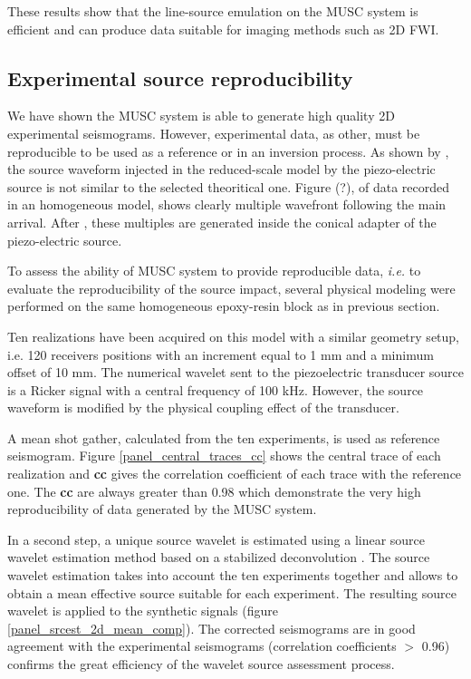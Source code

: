 \documentclass[manuscript,revised]{geophysics}
\begin{document}
\noindent These results show that the line-source emulation on the MUSC system is efficient and can produce data suitable for imaging methods such as 2D FWI.


\subsection{Experimental source reproducibility}

\noindent We have shown the MUSC system is able to generate high quality 2D experimental seismograms. However, experimental data, as other, must be reproducible to be used as a reference or in an inversion process. As shown by \citet{Bretaudeau_SSM_2011}, the source waveform injected in the reduced-scale model by the piezo-electric source is not similar to the selected theoritical one. Figure (?), of data recorded in an homogeneous model, shows clearly multiple wavefront following the main arrival. After \citet{Bretaudeau_SSM_2011}, these multiples are generated inside the conical adapter of the piezo-electric source.

\noindent To assess the ability of MUSC system to provide reproducible data, \textit{i.e.} to evaluate the reproducibility of the source impact, several physical modeling were performed on the same homogeneous epoxy-resin block as in previous section. 

\noindent Ten realizations have been acquired on this model with a similar geometry setup, i.e. 120 receivers positions with an increment equal to 1 mm and a minimum offset of 10 mm. The numerical wavelet sent to the piezoelectric transducer source is a Ricker signal with a central frequency of 100 kHz. However, the source waveform is modified by the physical coupling effect of the transducer. 

\noindent A mean shot gather, calculated from the ten experiments, is used as reference seismogram. Figure \ref{panel_central_traces_cc} shows the central trace of each realization and \textbf{cc} gives the correlation coefficient of each trace with the reference one. The \textbf{cc} are always greater than 0.98 which demonstrate the very high reproducibility of data generated by the MUSC system.

\noindent In a second step, a unique source wavelet is estimated using a linear source wavelet estimation method based on a stabilized deconvolution \citep{Pratt_FWI_1999}. The source wavelet estimation takes into account the ten experiments together and allows to obtain a mean effective source suitable for each experiment. The resulting source wavelet is applied to the synthetic signals (figure \ref{panel_srcest_2d_mean_comp}). The corrected seismograms are in good agreement with the experimental seismograms (correlation coefficients $\mathrm{>}$ 0.96) confirms the great efficiency of the wavelet source assessment process.  
\end{document}
